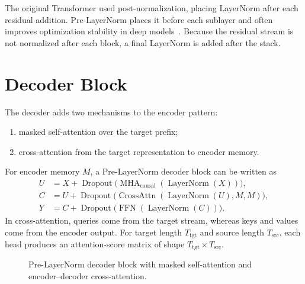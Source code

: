 \documentclass[11pt]{article}
\newcommand{\LN}{\operatorname{LayerNorm}}
\newcommand{\MHA}{\operatorname{MHA}}
\newcommand{\FFN}{\operatorname{FFN}}
\newcommand{\Drop}{\operatorname{Dropout}}
\begin{document}
The original Transformer used post-normalization, placing LayerNorm after each residual addition. Pre-LayerNorm places it before each sublayer and often improves optimization stability in deep models~\cite{xiong2020layernorm}. Because the residual stream is not normalized after each block, a final LayerNorm is added after the stack.

\section{Decoder Block}
\label{sec:decoder}

The decoder adds two mechanisms to the encoder pattern:
\begin{enumerate}
  \item masked self-attention over the target prefix;
  \item cross-attention from the target representation to encoder memory.
\end{enumerate}
For encoder memory $M$, a Pre-LayerNorm decoder block can be written as
\begin{align}
  U &= X + \Drop\bigl(\MHA_{\mathrm{causal}}(\LN(X))\bigr), \\
  C &= U + \Drop\bigl(\operatorname{CrossAttn}(\LN(U),M,M)\bigr), \\
  Y &= C + \Drop\bigl(\FFN(\LN(C))\bigr).
\end{align}
In cross-attention, queries come from the target stream, whereas keys and values come from the encoder output. For target length $T_{\mathrm{tgt}}$ and source length $T_{\mathrm{src}}$, each head produces an attention-score matrix of shape $T_{\mathrm{tgt}}\times T_{\mathrm{src}}$.

\begin{figure}[htbp]
\centering
{}
\caption{Pre-LayerNorm decoder block with masked self-attention and encoder--decoder cross-attention.}
\label{fig:decoder_block}
\end{figure}
\end{document}
